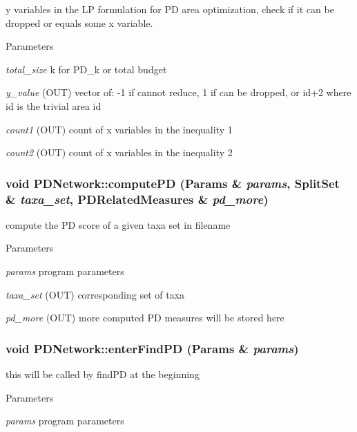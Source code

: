 \label{classPDNetwork_a438360816421d31dc8902323ce57a497}
y variables in the LP formulation for PD area optimization, check if it can be dropped or equals some x variable. 
\begin{DoxyParams}{Parameters}
\item[{\em total\_\-size}]k for PD\_\-k or total budget \item[{\em y\_\-value}](OUT) vector of: -\/1 if cannot reduce, 1 if can be dropped, or id+2 where id is the trivial area id \item[{\em count1}](OUT) count of x variables in the inequality 1 \item[{\em count2}](OUT) count of x variables in the inequality 2 \end{DoxyParams}
\hypertarget{classPDNetwork_a7a4584a81ad96405c27083bc436ab9ce}{
\subsubsection[{computePD}]{\setlength{\rightskip}{0pt plus 5cm}void PDNetwork::computePD ({\bf Params} \& {\em params}, \/  {\bf SplitSet} \& {\em taxa\_\-set}, \/  {\bf PDRelatedMeasures} \& {\em pd\_\-more})}}
\label{classPDNetwork_a7a4584a81ad96405c27083bc436ab9ce}
compute the PD score of a given taxa set in filename 
\begin{DoxyParams}{Parameters}
\item[{\em params}]program parameters \item[{\em taxa\_\-set}](OUT) corresponding set of taxa \item[{\em pd\_\-more}](OUT) more computed PD measures will be stored here \end{DoxyParams}
\hypertarget{classPDNetwork_a43fb83d870d86c62c10e57e8eac7ecdd}{
\subsubsection[{enterFindPD}]{\setlength{\rightskip}{0pt plus 5cm}void PDNetwork::enterFindPD ({\bf Params} \& {\em params})}}
\label{classPDNetwork_a43fb83d870d86c62c10e57e8eac7ecdd}
this will be called by findPD at the beginning 
\begin{DoxyParams}{Parameters}
\item[{\em params}]program parameters \end{DoxyParams}
